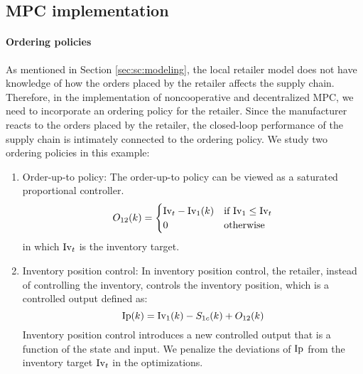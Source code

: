 \subsection*{MPC implementation}
\paragraph{Ordering policies}
As mentioned in Section \ref{sec:sc:modeling}, the local retailer model
does not have knowledge of how the orders placed by the retailer
affects the supply chain. Therefore, in the implementation of
noncooperative and decentralized MPC, we need to incorporate an
ordering policy for the retailer. Since the manufacturer reacts to the
orders placed by the retailer, the closed-loop performance of the
supply chain is intimately connected to the ordering policy.
We study two ordering policies in this example:
\begin{enumerate}
\item Order-up-to policy: The order-up-to  policy can be viewed as a
  saturated proportional  controller.
\begin{equation}
    O_{12}(k) = \begin{cases} \textrm{Iv}_t-\textrm{Iv}_1(k) & \text{if $\textrm{Iv}_1 \leq \textrm{Iv}_t$} \\
            0 & \text{otherwise}  \end{cases}
\end{equation}
in which $\textrm{Iv}_t$ is the inventory target.
 
\item Inventory position control: In inventory position control, the
  retailer, instead of controlling the inventory, controls the
  inventory position, which is a controlled output defined as:
 \begin{equation}
   \textrm{Ip}(k) = \textrm{Iv}_1(k)-S_{1c}(k) + O_{12}(k)
  \end{equation}
  Inventory position control introduces a new
  controlled output that is a function of the state and input. We
  penalize the deviations of $\textrm{Ip}$ from the inventory target
  $\textrm{Iv}_t$ in the optimizations.
\end{enumerate}

